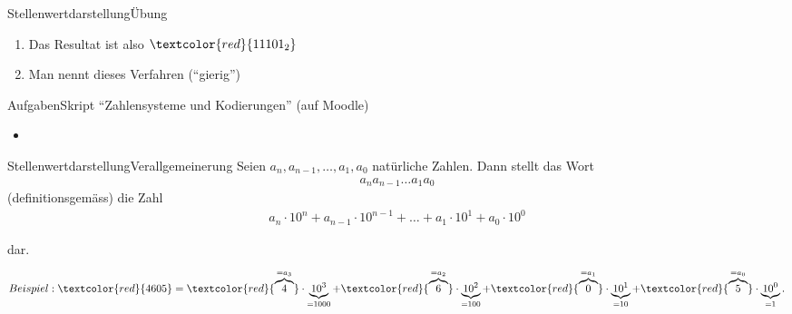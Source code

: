 \begin{frame}{Stellenwertdarstellung}{Übung}
\begin{enumerate}
{\begin{align*}
        \textcolor{red}{a_3}\cdot \underbrace{2^3}_{=8} + 
        \textcolor{red}{a_2}\cdot \underbrace{2^2}_{=4} +
        \textcolor{red}{a_1}\cdot \underbrace{2^1}_{=2} + 
        \textcolor{red}{a_0}\cdot \underbrace{2^0}_{=1}.
    \end{align*}
    }
    \item<7-> Das Resultat ist also $\textcolor{red}{11101_2}$
    \item<8-> Man nennt dieses Verfahren  (\enquote{gierig})
    
    
\end{enumerate}
\end{frame}

\begin{frame}{Aufgaben}{Skript \enquote{Zahlensysteme und Kodierungen} (auf Moodle)}
\begin{itemize}
    \item {}
\end{itemize}
\end{frame}


\begin{frame}{Stellenwertdarstellung}{Verallgemeinerung}
    Seien $a_n,a_{n-1},\ldots,a_1,a_0$ natürliche Zahlen. Dann stellt das Wort
    \begin{align*}
        a_na_{n-1}\ldots a_1a_0
    \end{align*}
    (definitionsgemäss) die Zahl
    \begin{align*}
        a_n\cdot 10^n + a_{n-1}\cdot 10^{n-1}+\ldots + a_1\cdot 10^1 + a_0\cdot 10^0
    \end{align*}

    dar.

    
\begin{align*}
    Beispiel: \textcolor{red}{4605} = \textcolor{red}{\overbrace{4}^{=a_3}}\cdot \underbrace{10^3}_{=1000} + \textcolor{red}{\overbrace{6}^{=a_2}}\cdot \underbrace{10^2}_{=100} + \textcolor{red}{\overbrace{0}^{=a_1}}\cdot \underbrace{10^1}_{=10} + \textcolor{red}{\overbrace{5}^{=a_0}}\cdot \underbrace{10^0}_{=1}.
\end{align*}

\end{frame}



